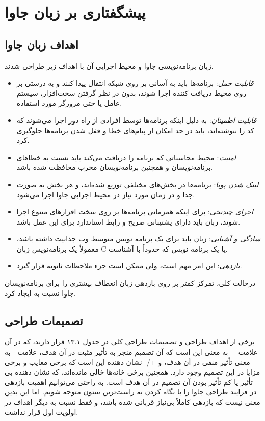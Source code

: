 \documentclass[a4paper,12pt]{report}
\begin{document}
	\section{پیشگفتاری بر زبان جاوا}\label{sec1:chap13}
	\subsection{اهداف زبان جاوا}\label{subsec1:sec1:chap13}
	
	زبان برنامه‌نویسی جاوا و محیط اجرایی آن با اهداف زیر طراحی شدند.
	
	\begin{itemize}[nosep]
		\renewcommand{\labelitemi}{\color{gray}\scriptsize$\blacksquare$}
		\item 
		\textit{
		قابلیت حمل}: برنامه‌ها باید به آسانی بر روی شبکه انتقال پیدا کنند و به درستی بر روی محیط دریافت کننده اجرا شوند، بدون در نظر گرفتن سخت‌افزار، سیستم عامل یا حتی مرورگر مورد استفاده.
		\item
		\textit{
		قابلیت اطمینان}: به دلیل اینکه برنامه‌ها توسط افرادی از راه دور اجرا می‌شوند که کد را ننوشته‌اند، باید در حد امکان از پیام‌های خطا و قفل شدن برنامه‌ها جلوگیری کرد.
		\item \textit{
		امنیت}: محیط محاسباتی که برنامه را دریافت می‌کند باید نسبت به خطا‌های برنامه‌نویسان و همچنین برنامه‌نویسان مخرب محافظت شده باشد.
		\item \textit{
		لینک شدن پویا}: برنامه‌ها در بخش‌های مختلفی توزیع شده‌اند، و هر بخش به صورت جدا و در زمان مورد نیاز در محیط اجرایی جاوا اجرا می‌شود.
		\item \textit{
		اجرای چندنخی}: برای اینکه همزمانی برنامه‌ها بر روی سخت افزار‌های متنوع اجرا شوند، زبان باید دارای پشتیبانی صریح و رابط استاندارد برای این عمل  باشد.
		\item \textit{
		سادگی و آشنایی}: زبان باید برای یک برنامه نویس متوسط وب جذابیت داشته باشد، معمولاً یک برنامه‌نویس زبان C یا یک برنامه نویس که حدوداً با 
		آشناست.
		\item \textit{
		بازدهی}: این امر مهم است، ولی ممکن است جزء ملاحظات ثانویه قرار گیرد.
	\end{itemize}
	
	درحالت کلی، تمرکز کمتر بر روی بازدهی زبان انعطاف بیشتری را برای برنامه‌نویسان جاوا نسبت به 
	ایجاد کرد.	
	
	\subsection{تصمیمات طراحی}\label{subsec2:sec1:chap13}
	برخی از اهداف طراحی و تصمیمات طراحی کلی در 
	\hyperref[table1:chap13]{جدول ۱۳.۱}
	 قرار دارند، که در آن علامت + به معنی این است که آن تصمیم منجر به تأثیر مثبت در آن هدف، علامت - به معنی تأثیر منفی در آن هدف، و +/-	نشان دهنده این است که برخی معایب و برخی مزایا در این تصمیم وجود دارد. همچنین برخی خانه‌ها خالی مانده‌اند، که نشان دهنده بی تأثیر یا کم تأثیر بودن آن تصمیم در آن هدف است. به راحتی می‌توانیم اهمیت بازدهی در فرایند طراحی جاوا را با نگاه کردن به  راست‌ترین ستون متوجه شویم. اما این بدین معنی نیست که بازدهی کاملاً بی‌نیاز قربانی شده باشد، و فقط نسبت به دیگر اهداف در اولویت اول قرار نداشت.
	
\end{document}
